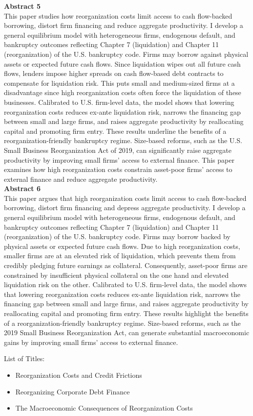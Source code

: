 \documentclass[12pt]{article}
\begin{document}
\textbf{Abstract 5} \\
This paper studies how reorganization costs limit access to cash flow-backed borrowing, distort firm financing and reduce aggregate productivity. I develop a general equilibrium model with heterogeneous firms, endogenous default, and bankruptcy outcomes reflecting Chapter 7 (liquidation) and Chapter 11 (reorganization) of the U.S. bankruptcy code. Firms may borrow against physical assets or expected future cash flows. Since liquidation wipes out all future cash flows, lenders impose higher spreads on cash flow-based debt contracts to compensate for liquidation risk. This puts small and medium-sized firms at a disadvantage since high reorganization costs often force the liquidation of these businesses. Calibrated to U.S. firm-level data, the model shows that lowering reorganization costs reduces ex-ante liquidation risk, narrows the financing gap between small and large firms, and raises aggregate productivity by reallocating capital and promoting firm entry. These results underline the benefits of a reorganization-friendly bankruptcy regime. Size-based reforms, such as the U.S. Small Business Reorganization Act of 2019, can significantly raise aggregate productivity by improving small firms’ access to external finance. This paper examines how high reorganization costs constrain asset-poor firms’ access to external finance and reduce aggregate productivity. \vspace{3mm} \\


\textbf{Abstract 6} \\
This paper argues that high reorganization costs limit access to cash flow-backed borrowing, distort firm financing and depress aggregate productivity. I develop a general equilibrium model with heterogeneous firms, endogenous default, and bankruptcy outcomes reflecting Chapter 7 (liquidation) and Chapter 11 (reorganization) of the U.S. bankruptcy code. Firms may borrow backed by physical assets or expected future cash flows. Due to high reorganization costs, smaller firms are at an elevated risk of liquidation, which prevents them from credibly pledging future earnings as collateral. Consequently, asset-poor firms are constrained by insufficient physical collateral on the one hand and elevated liquidation risk on the other. Calibrated to U.S. firm-level data, the model shows that lowering reorganization costs reduces ex-ante liquidation risk, narrows the financing gap between small and large firms, and raises aggregate productivity by reallocating capital and promoting firm entry. These results highlight the benefits of a reorganization-friendly bankruptcy regime. Size-based reforms, such as the 2019 Small Business Reorganization Act, can generate substantial macroeconomic gains by improving small firms’ access to external finance.


List of Titles: 
\begin{itemize}
    \item Reorganization Costs and Credit Frictions
    \item Reorganizing Corporate Debt Finance
    \item The Macroeconomic Consequences of Reorganization Costs
\end{itemize}
\end{document}
